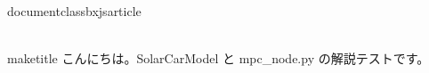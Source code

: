 \\documentclass{bxjsarticle}
\begin{document}
\\maketitle
こんにちは。SolarCarModel と mpc_node.py の解説テストです。
\
\end{document}
